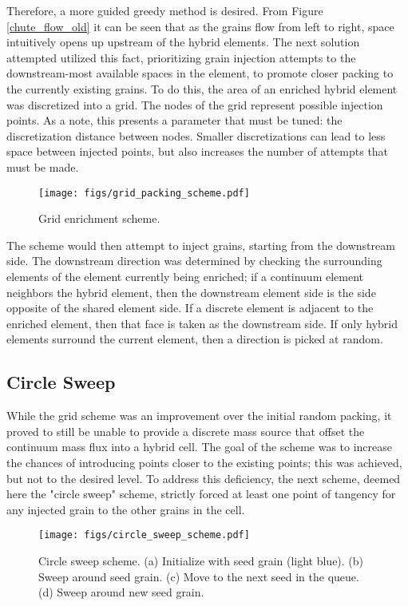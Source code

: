 Therefore, a more guided greedy method is desired. From Figure \ref{chute_flow_old} it can be seen that as the grains flow from left to right, space intuitively opens up upstream of the hybrid elements. The next solution attempted utilized this fact, prioritizing grain injection attempts to the downstream-most available spaces in the element, to promote closer packing to the currently existing grains. To do this, the area of an enriched hybrid element was discretized into a grid. The nodes of the grid represent possible injection points. As a note, this presents a parameter that must be tuned: the discretization distance between nodes. Smaller discretizations can lead to less space between injected points, but also increases the number of attempts that must be made. 

\begin{figure}[htp] 
    \centering
    \texttt{[image: figs/grid\_packing\_scheme.pdf]}
    \caption{Grid enrichment scheme.}
    \label{grid_enrichment}
\end{figure}

The scheme would then attempt to inject grains, starting from the downstream side. The downstream direction was determined by checking the surrounding elements of the element currently being enriched; if a continuum element neighbors the hybrid element, then the downstream element side is the side opposite of the shared element side. If a discrete element is adjacent to the enriched element, then that face is taken as the downstream side. If only hybrid elements surround the current element, then a direction is picked at random. 

\subsection{Circle Sweep}
\def\seed{\textbf{seed\_queue }}
While the grid scheme was an improvement over the initial random packing, it proved to still be unable to provide a discrete mass source that offset the continuum mass flux into a hybrid cell. The goal of the scheme was to increase the chances of introducing points closer to the existing points; this was achieved, but not to the desired level. To address this deficiency, the next scheme, deemed here the "circle sweep" scheme, strictly forced at least one point of tangency for any injected grain to the other grains in the cell.

\begin{figure}[htp] 
    \centering
    \texttt{[image: figs/circle\_sweep\_scheme.pdf]}
    \caption{Circle sweep scheme. (a) Initialize with seed grain (light blue). (b) Sweep around seed grain. (c) Move to the next seed in the queue. (d) Sweep around new seed grain.}
    \label{circle_sweep_enrichment}
\end{figure}

